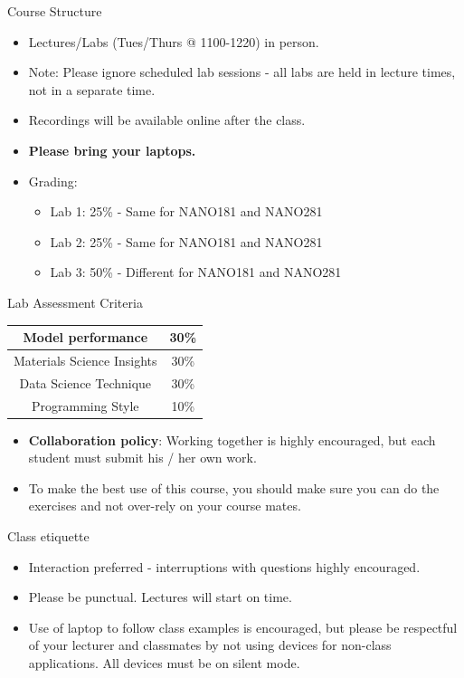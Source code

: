 \documentclass[aspectratio=169]{beamer}
\begin{document}
\begin{frame}{Course Structure}
    \begin{itemize}
        \item Lectures/Labs (Tues/Thurs @ 1100-1220) in person.
        \item Note: Please ignore scheduled lab sessions - all labs are held in lecture times, not in a separate time.
        \item Recordings will be available online after the class.
        \item \textbf{Please bring your laptops.}
        \item Grading:
        \begin{itemize}
            \item Lab 1: 25\% - Same for NANO181 and NANO281
            \item Lab 2: 25\% - Same for NANO181 and NANO281
            \item Lab 3: 50\% - Different for NANO181 and NANO281
        \end{itemize}
    \end{itemize}
\end{frame}


\begin{frame}{Lab Assessment Criteria}
\begin{table}[]
    \centering
    \begin{tabular}{|c|c|}
    \hline
Model performance & 30\%\\
\hline
Materials Science Insights & 30\%\\
\hline
Data Science Technique & 30\%\\
\hline
Programming Style & 10\%\\
\hline
    \end{tabular}
\end{table}
    \begin{itemize}
        \item \textbf{Collaboration policy}:  Working together is highly encouraged, but each student must submit his / her own work. 
        \item To make the best use of this course, you should make sure you can do the exercises and not over-rely on your course mates.
    \end{itemize}
\end{frame}


\begin{frame}{Class etiquette}
    \begin{itemize}
        \item Interaction preferred - interruptions with questions highly encouraged.
        \item Please be punctual. Lectures will start on time.
        \item Use of laptop to follow class examples is encouraged, but please be respectful of your lecturer and classmates by not using devices for non-class applications.  All devices must be on silent mode.
    \end{itemize}
\end{frame}
\end{document}
